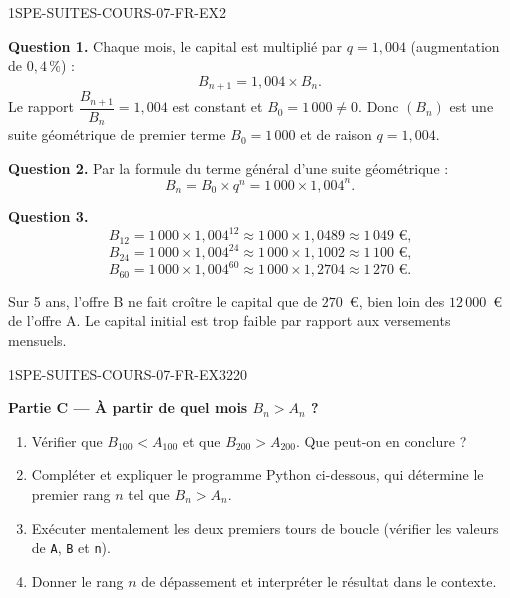\begin{corrige}{1SPE-SUITES-COURS-07-FR-EX2}


\textbf{Question 1.} Chaque mois, le capital est multiplié par $q = 1{,}004$ (augmentation de $0{,}4\,\%$) :
\[
  B_{n+1} = 1{,}004 \times B_n.
\]
Le rapport $\dfrac{B_{n+1}}{B_n} = 1{,}004$ est constant et $B_0 = 1\,000 \neq 0$. Donc $(B_n)$ est une suite géométrique de premier terme $B_0 = 1\,000$ et de raison $q = 1{,}004$.

\textbf{Question 2.} Par la formule du terme général d'une suite géométrique :
\[
  B_n = B_0 \times q^n = 1\,000 \times 1{,}004^n.
\]

\textbf{Question 3.}
\[
  B_{12} = 1\,000 \times 1{,}004^{12} \approx 1\,000 \times 1{,}0489 \approx 1\,049 \text{ €,}
\]
\[
  B_{24} = 1\,000 \times 1{,}004^{24} \approx 1\,000 \times 1{,}1002 \approx 1\,100 \text{ €,}
\]
\[
  B_{60} = 1\,000 \times 1{,}004^{60} \approx 1\,000 \times 1{,}2704 \approx 1\,270 \text{ €.}
\]

Sur 5 ans, l'offre B ne fait croître le capital que de $270$~€, bien loin des $12\,000$~€ de l'offre A. Le capital initial est trop faible par rapport aux versements mensuels.

\end{corrige}

\bigskip


\begin{exercice}{1SPE-SUITES-COURS-07-FR-EX3}{2}{20}

\textbf{Partie C — À partir de quel mois $B_n > A_n$ ?}

\begin{enumerate}
  \item Vérifier que $B_{100} < A_{100}$ et que $B_{200} > A_{200}$. Que peut-on en conclure ?
  \item Compléter et expliquer le programme Python ci-dessous, qui détermine le premier rang $n$ tel que $B_n > A_n$.
  \item Exécuter mentalement les deux premiers tours de boucle (vérifier les valeurs de \texttt{A}, \texttt{B} et \texttt{n}).
  \item Donner le rang $n$ de dépassement et interpréter le résultat dans le contexte.
\end{enumerate}

\end{exercice}

